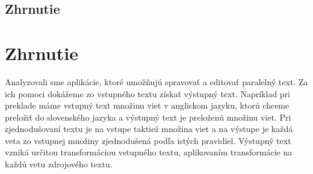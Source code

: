 %
%
{
	\subsection{Zhrnutie}
}
{
	\section{Zhrnutie}
}
\label{subsection:analysis2:zhrnutie}
Analyzovali sme aplikácie, ktoré umožňujú spravovať a editovať paralelný text. Za ich pomoci dokážeme zo vstupného textu získať výstupný text. Napríklad pri preklade máme vstupný text množinu viet v anglickom jazyku, ktorú chceme preložiť do slovenského jazyka a výstupný text je preloženú množinu viet. Pri zjednodušovaní textu je na vstupe taktiež množina viet a na výstupe je každá veta zo vstupnej množiny zjednodušená podľa istých pravidiel. Výstupný text vzniká určitou transformáciou vstupného textu, aplikovaním transformácie na každú vetu zdrojového textu.
